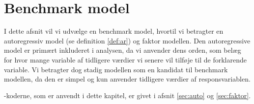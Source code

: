 \chapter{Benchmark model} \label{ch:benhcmarkmodel}
I dette afsnit vil vi udvælge en benchmark model, hvortil vi betragter en autoregressiv model (se definition \ref{def:ar}) og faktor modellen. 
Den autoregressive model er primært inkluderet i analysen, da vi anvender dens orden, som belæg for hvor mange variable af tidligere værdier vi senere vil tilføje til de forklarende variable.
Vi betragter dog stadig modellen som en kandidat til benchmark modellen, da den er simpel og kun anvender tidligere værdier af responsvariablen.

\Rlang-koderne, som er anvendt i dette kapitel, er givet i afsnit \ref{sec:auto} og \ref{sec:faktor}.





